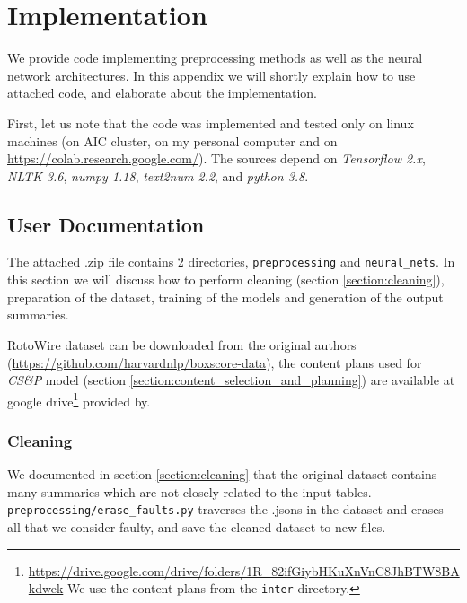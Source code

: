 \chapter{Implementation} \label{chapter:appendix_a}

We provide code implementing preprocessing methods as well as the neural network architectures. In this appendix we will shortly explain how to use attached code, and elaborate about the implementation.

First, let us note that the code was implemented and tested only on linux machines (on AIC cluster, on my personal computer and on \url{https://colab.research.google.com/}). The sources depend on \emph{Tensorflow 2.x}, \emph{NLTK 3.6}, \emph{numpy 1.18}, \emph{text2num 2.2}, and \emph{python 3.8}.

\section{User Documentation}

The attached .zip file contains 2 directories, \texttt{preprocessing} and \texttt{neural\_nets}. In this section we will discuss how to perform cleaning (section \ref{section:cleaning}), preparation of the dataset, training of the models and generation of the output summaries.

RotoWire dataset can be downloaded from the original authors \citep{wiseman2017} (\url{https://github.com/harvardnlp/boxscore-data}), the content plans used for \emph{CS\&P} model (section \ref{section:content_selection_and_planning}) are available at google drive\footnote{\url{https://drive.google.com/drive/folders/1R_82ifGiybHKuXnVnC8JhBTW8BAkdwek} We use the content plans from the \texttt{inter} directory.} provided by\linebreak\citet{puduppully2019datatotext}.

\subsection{Cleaning}

We documented in section \ref{section:cleaning} that the original dataset contains \linebreak many summaries which are not closely related to the input tables. \linebreak \texttt{preprocessing/erase\_faults.py} traverses the .jsons in the dataset and erases all that we consider faulty, and save the cleaned dataset to new files.

